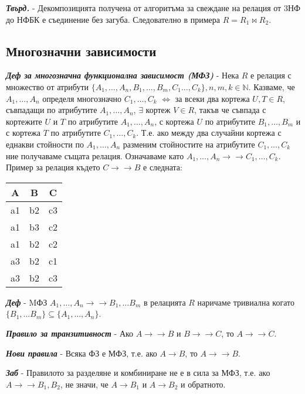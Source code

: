 \documentclass[fleqn,12pt]{article}
\begin{document}
\textbf{\textit{Твърд.}} - Декомпозицията получена от алгоритъма за свеждане на релация от 3НФ до НФБК е съединение без загуба.
Следователно в примера $R = R_1 \bowtie R_2$.

\subsection{Многозначни зависимости}

\textbf{\textit{Деф за многозначна функционална зависимост (МФЗ)}} - Нека $R$ е релация с множество от атрибути $\{A_1, \dots, A_n, B_1, \dots, B_m, C_1 \dots, C_k\}, n, m, k \in \mathbb{N}$.
Казваме, че $A_1, \dots, A_n$ определя многозначно $C_1, \dots, C_k$ $\iff$ за всеки два кортежа $U, T \in R$, съвпадащи по атрибутите $A_1, \dots, A_n$, $\exists$ кортеж $V \in R$, такъв че съвпада с кортежите $U$ и $T$ по атрибутите $A_1, \dots, A_n$, с кортежа $U$ по атрибутите $B_1, \dots, B_m$ и с кортежа $T$ по атрибутите $C_1, \dots, C_k$.
Т.е. ако между два случайни кортежа с еднакви стойности по $A_1, \dots, A_n$ разменим стойностите на атрибутите $C_1, \dots, C_k$ ние получаваме същата релация.
Означаваме като $A_1, \dots, A_n \rightarrow \rightarrow C_1, \dots, C_k$.
\bigbreak
Пример за релация където $C \rightarrow \rightarrow B$ е следната:

\begin{center}
\begin{tabular}{ |c|c|c| } 
    \hline
    A & B & C \\
    \hline
    a1 & b2 & c3 \\ 
    a1 & b3 & c2 \\ 
    a1 & b2 & c2 \\ 
    a3 & b2 & c1 \\
    a3 & b2 & c3 \\
    \hline
\end{tabular}
\end{center}

\textbf{\textit{Деф}} - MФЗ $A_1, \dots, A_n \rightarrow \rightarrow B_1, \dots B_m$ в релацията $R$ наричаме тривиална когато $\{B_1, \dots B_m\} \subseteq \{A_1, \dots, A_n\}$.

\textbf{\textit{Правило за транзитивност}} - Ако $A \rightarrow \rightarrow B$ и $B \rightarrow \rightarrow C$, то $A \rightarrow \rightarrow C$.

\textbf{\textit{Нови правила}} - Всяка ФЗ е МФЗ, т.е. ако $A \rightarrow B$, то $A \rightarrow \rightarrow B$.

\textbf{\textit{Заб}} - Правилото за разделяне и комбиниране не е в сила за МФЗ, т.е. ако $A \rightarrow \rightarrow B_1, B_2$, не значи, че $A \rightarrow B_1$ и $A \rightarrow B_2$ и обратното.
\end{document}
